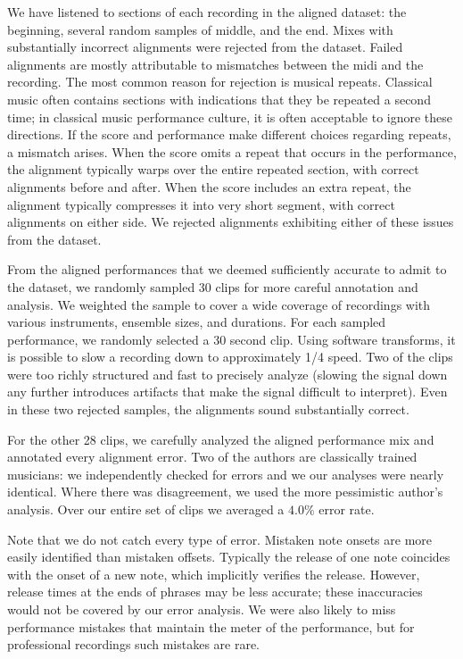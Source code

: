 \documentclass{article} \usepackage{iclr2017_conference,times}
\begin{document}
We have listened to sections of each recording in the aligned dataset: the beginning, several random samples of middle, and the end. Mixes with substantially incorrect alignments were rejected from the dataset. Failed alignments are mostly attributable to mismatches between the midi and the recording. The most common reason for rejection is musical repeats. Classical music often contains sections with indications that they be repeated a second time; in classical music performance culture, it is often acceptable to ignore these directions. If the score and performance make different choices regarding repeats, a mismatch arises. When the score omits a repeat that occurs in the performance, the alignment typically warps over the entire repeated section, with correct alignments before and after. When the score includes an extra repeat, the alignment typically compresses it into very short segment, with correct alignments on either side. We rejected alignments exhibiting either of these issues from the dataset.

From the aligned performances that we deemed sufficiently accurate to admit to the dataset, we randomly sampled 30 clips for more careful annotation and analysis. We weighted the sample to cover a wide coverage of recordings with various instruments, ensemble sizes, and durations. For each sampled performance, we randomly selected a 30 second clip. Using software transforms, it is possible to slow a recording down to approximately 1/4 speed. Two of the clips were too richly structured and fast to precisely analyze (slowing the signal down any further introduces artifacts that make the signal difficult to interpret). Even in these two rejected samples, the alignments sound substantially correct. 

For the other 28 clips, we carefully analyzed the aligned performance mix and annotated every alignment error. Two of the authors are classically trained musicians: we independently checked for errors and we our analyses were nearly identical. Where there was disagreement, we used the more pessimistic author's analysis. Over our entire set of clips we averaged a $4.0\%$ error rate. 

Note that we do not catch every type of error. Mistaken note onsets are more easily identified than mistaken offsets. Typically the release of one note coincides with the onset of a new note, which implicitly verifies the release. However, release times at the ends of phrases may be less accurate; these inaccuracies would not be covered by our error analysis. We were also likely to miss performance mistakes that maintain the meter of the performance, but for professional recordings such mistakes are rare. 
\end{document}
